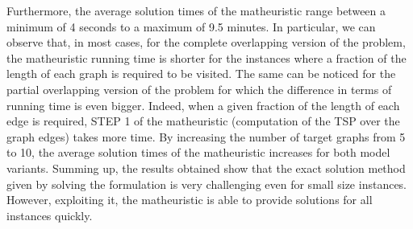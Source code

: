 \noindent
Furthermore, the average solution times of the matheuristic range between a minimum of 4 seconds to a maximum of 9.5 minutes. In particular, we can observe that, in most cases, for the complete overlapping version of the problem, the matheuristic running time is shorter for the instances where a fraction of the length of each graph is required to be visited. The same  can be noticed for the partial overlapping version of the problem for which the difference in terms of running time is even bigger. Indeed, when a given fraction of the length of each edge is required, STEP 1 of the matheuristic (computation of the TSP over the graph edges) takes more time. %
By increasing the number of target graphs from 5 to 10, the average solution times of the matheuristic increases for both model variants.
Summing up, the results obtained show that the exact solution method given by solving the formulation is very challenging even for small size instances. However, exploiting it, the matheuristic is able to provide  solutions for all instances  quickly.
